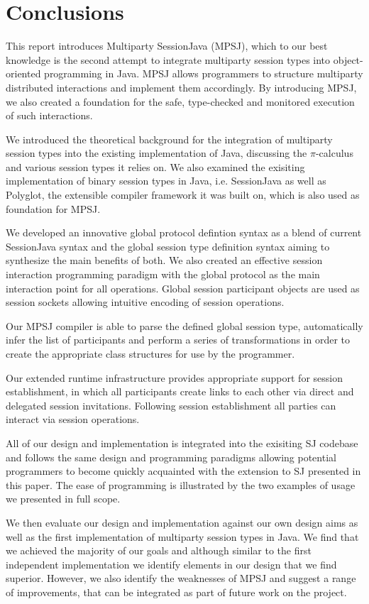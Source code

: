 \cleardoublepage
\chapter{Conclusions}
\label{ch:conclusions}



This report introduces Multiparty SessionJava (MPSJ), which to our best knowledge is the second attempt to integrate multiparty session types into object-oriented programming in Java. MPSJ allows programmers to structure multiparty distributed interactions and implement them accordingly. By introducing MPSJ, we also created a foundation for the safe, type-checked and monitored execution of such interactions.

We introduced the theoretical background for the integration of multiparty session types into the existing implementation of Java, discussing the $\pi$-calculus and various session types it relies on. We also examined the exisiting implementation of binary session types in Java, i.e. SessionJava as well as Polyglot, the extensible compiler framework it was built on, which is also used as foundation for MPSJ.

We developed an innovative global protocol defintion syntax as a blend of current SessionJava syntax and the global session type definition syntax aiming to synthesize the main benefits of both. We also created an effective session interaction programming paradigm with the global protocol as the main interaction point for all operations. Global session participant objects are used as session sockets allowing intuitive encoding of session operations.

Our MPSJ compiler is able to parse the defined global session type, automatically infer the list of participants and perform a series of transformations in order to create the appropriate class structures for use by the programmer. 

Our extended runtime infrastructure provides appropriate support for session establishment, in which all participants create links to each other via direct and delegated session invitations. Following session establishment all parties can interact via session operations. 

All of our design and implementation is integrated into the exisiting SJ codebase and follows the same design and programming paradigms allowing potential programmers to become quickly acquainted with the extension to SJ presented in this paper. The ease of programming is illustrated by the two examples of usage we presented in full scope.

We then evaluate our design and implementation against our own design aims as well as the first implementation of multiparty session types in Java. We find that we achieved the majority of our goals and although similar to the first independent implementation we identify elements in our design that we find superior. However, we also identify the weaknesses of MPSJ and suggest a range of improvements, that can be integrated as part of future work on the project. 